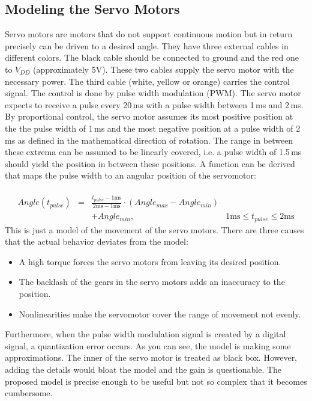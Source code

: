 \documentclass{sig-alternate-05-2015}
\begin{document}
\subsection{Modeling the Servo Motors}
Servo motors are motors that do not support continuous motion but in return precisely can be driven to a desired angle. They have three external cables in different colors. The black cable should be connected to ground and the red one to $V_{DD}$ (approximately 5V). These two cables supply the servo motor with the necessary power. The third cable (white, yellow or orange) carries the control signal. The control is done by pulse width modulation (PWM). The servo motor expects to receive a pulse every 20\,ms with a pulse width between 1\,ms and 2\,ms. By proportional control, the servo motor assumes its most positive position at the the pulse width of 1\,ms and the most negative position at a pulse width of 2\,ms as defined in the mathematical direction of rotation. The range in between these extrema can be assumed to be linearly covered, i.e. a pulse width of 1.5\,ms should yield the position in between these positions. A function can be derived that maps the pulse width to an angular position of the servomotor:
\begin{align*}
	
\end{align*}

\begin{eqnarray}
Angle(t_{pulse}) &=& \frac{t_{pulse} -1 \text{ms} }{2 \text{ms}-1 \text{ms}}\cdot \left(Angle_{max}-Angle_{min}\right)&\nonumber \\ &&+Angle_{min},&1 \text{ms} \le t_{pulse}\le 2 \text{ms}  \nonumber
\end{eqnarray}
This is just a model of the movement of the servo motors. There are three causes that the actual behavior deviates from the model:
\begin{itemize}
	\item A high torque forces the servo motors from leaving its desired position.
	\item The backlash of the gears in the servo motors adds an inaccuracy to the position.
	\item Nonlinearities make the servomotor cover the range of movement not evenly.
\end{itemize}
Furthermore, when the pulse width modulation signal is created by a digital signal, a quantization error occurs.
As you can see, the model is making some approximations. The inner of the servo motor is treated as black box. However, adding the details would bloat the model and the gain is questionable. The proposed model is precise enough to be useful but not so complex that it becomes cumbersome.
\end{document}
